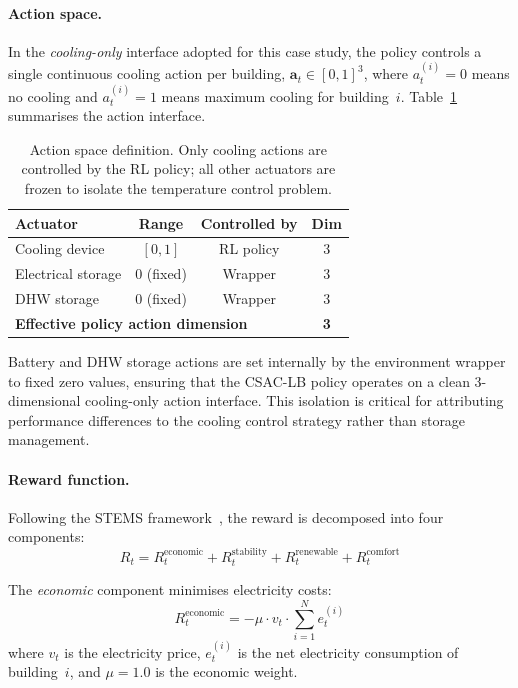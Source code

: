 \paragraph{Action space.}
In the \emph{cooling-only} interface adopted for this case study, the policy
controls a single continuous cooling action per building,
$\mathbf{a}_t \in [0,1]^3$, where $a_t^{(i)} = 0$ means no cooling and
$a_t^{(i)} = 1$ means maximum cooling for building~$i$.
Table~\ref{tab:action-space} summarises the action interface.

\begin{table}[htbp]
\centering
\caption{Action space definition.  Only cooling actions are controlled by the
  RL policy; all other actuators are frozen to isolate the temperature control
  problem.}
\label{tab:action-space}
\begin{tabular}{lccc}
\toprule
\textbf{Actuator} & \textbf{Range} & \textbf{Controlled by} & \textbf{Dim} \\
\midrule
Cooling device & $[0, 1]$ & RL policy & $3$ \\
Electrical storage & $0$ (fixed) & Wrapper & $3$ \\
DHW storage & $0$ (fixed) & Wrapper & $3$ \\
\midrule
\multicolumn{3}{l}{\textbf{Effective policy action dimension}} & \textbf{3} \\
\bottomrule
\end{tabular}
\end{table}

Battery and DHW storage actions are set internally by the environment wrapper
to fixed zero values, ensuring that the CSAC-LB policy operates on a clean
3-dimensional cooling-only action interface.  This isolation is critical for
attributing performance differences to the cooling control strategy rather
than storage management.

\paragraph{Reward function.}
Following the STEMS framework~\cite{zhang2025stems}, the reward is decomposed
into four components:
\begin{equation}
  R_t = R_t^{\text{economic}} + R_t^{\text{stability}} +
        R_t^{\text{renewable}} + R_t^{\text{comfort}}
  \label{eq:reward-decomposition}
\end{equation}

The \emph{economic} component minimises electricity costs:
\begin{equation}
  R_t^{\text{economic}} = -\mu \cdot v_t \cdot \sum_{i=1}^{N} e_t^{(i)}
  \label{eq:reward-economic}
\end{equation}
where $v_t$ is the electricity price, $e_t^{(i)}$ is the net electricity
consumption of building~$i$, and $\mu = 1.0$ is the economic weight.

